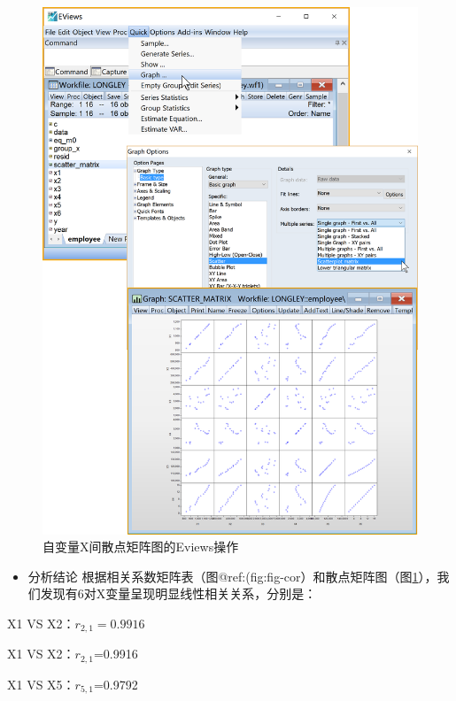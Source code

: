 \documentclass[12pt,(landscape,a4paper),(portrait,a4paper)]{article}
\providecommand{\tightlist}{%
  \setlength{\itemsep}{0pt}\setlength{\parskip}{0pt}}
\begin{document}
\begin{figure}

{\centering \includegraphics[width=8in]{picture/lab5-multilinearity/2-scatter-matrix} 

}

\caption{自变量X间散点矩阵图的Eviews操作}\label{fig:fig-scatter}
\end{figure}

\begin{itemize}
\tightlist
\item
  分析结论
  根据相关系数矩阵表（图@ref:(fig:fig-cor）和散点矩阵图（图\ref{fig:fig-scatter}），我们发现有6对X变量呈现明显线性相关关系，分别是：
\end{itemize}

X1 VS X2：\(r_{2,1}=0.9916\)

X1 VS X2：\(r_{2,1}\)=0.9916

X1 VS X5：\(r_{5,1}\)=0.9792
\end{document}

